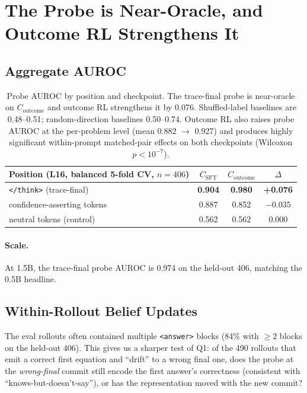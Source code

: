 \documentclass[11pt]{article}
\begin{document}
\section{The Probe is Near-Oracle, and Outcome RL Strengthens It}\label{sec:probe-reader}

\subsection{Aggregate AUROC}

\begin{table}[h]
\centering
\small
\begin{tabular}{lccc}
\toprule
Position (L16, balanced 5-fold CV, $n{=}406$) & $C_{\text{SFT}}$ & $C_{\text{outcome}}$ & $\Delta$ \\
\midrule
\texttt{</think>} (trace-final) & \textbf{0.904} & \textbf{0.980} & \textbf{+0.076} \\
confidence-asserting tokens & 0.887 & 0.852 & $-0.035$ \\
neutral tokens (control) & 0.562 & 0.562 & 0.000 \\
\bottomrule
\end{tabular}
\caption{Probe AUROC by position and checkpoint. The trace-final probe is near-oracle on $C_{\text{outcome}}$ and outcome RL strengthens it by 0.076. Shuffled-label baselines are 0.48--0.51; random-direction baselines 0.50--0.74. Outcome RL also raises probe AUROC at the per-problem level (mean 0.882 $\to$ 0.927) and produces highly significant within-prompt matched-pair effects on both checkpoints (Wilcoxon $p < 10^{-7}$).}
\end{table}

\paragraph{Scale.} At 1.5B, the trace-final probe AUROC is 0.974 on the held-out 406, matching the 0.5B headline.

\subsection{Within-Rollout Belief Updates}\label{sec:within-rollout}

The eval rollouts often contained multiple \texttt{<answer>} blocks (84\% with $\geq 2$ blocks on the held-out 406). This gives us a sharper test of Q1: of the 490 rollouts that emit a correct first equation and ``drift'' to a wrong final one, does the probe at the \emph{wrong-final} commit still encode the first answer's correctness (consistent with ``knows-but-doesn't-say''), or has the representation moved with the new commit?
\end{document}
